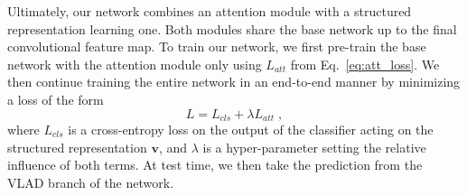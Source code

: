 \documentclass{bmvc2k}
\newcommand{\bv}{\mathbf{v}}
\begin{document}
Ultimately, our network combines an attention module with a structured representation learning one. Both modules share the base network up to the final convolutional feature map. To train our network, we first pre-train the base network with the attention module only using $L_{att}$ from Eq.~\ref{eq:att_loss}. We then continue training the entire network in an end-to-end manner by minimizing a loss of the form
\begin{equation}
L = L_{cls} + \lambda L_{att}\;, 
\label{eq:joint_loss}
\end{equation}
where $L_{cls}$ is a cross-entropy loss on the output of the classifier acting on the structured representation $\bv$, and $\lambda$ is a hyper-parameter setting the relative influence of both terms. At test time, we then take the prediction from the VLAD branch of the network.
\end{document}
